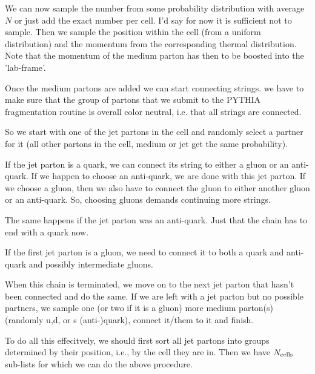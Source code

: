 We can now sample the number from some probability distribution with average $N$
or just add the exact number per cell. I'd say for now it is sufficient not to sample.
Then we sample the position within the cell (from a uniform distribution) and the momentum from the corresponding thermal 
distribution. Note that the momentum of the medium parton has then to be boosted into the 'lab-frame'.

Once the medium partons are added we can start connecting strings. we have to make sure that the group of partons that we
submit to the PYTHIA fragmentation routine is overall color neutral, i.e. that all strings are connected.

So we start with one of the jet partons in the cell and randomly select a partner for it (all other partons in the cell, 
medium or jet get the same probability).
 
If the jet parton is a quark, we can connect its string to either a gluon or an anti-quark. If we happen to choose an anti-quark,
we are done with this jet parton. If we choose a gluon, then we also have to connect the gluon to either another gluon or an anti-quark.
So, choosing gluons demands continuing more strings.

The same happens if the jet parton was an anti-quark. Just that the chain has to end with a quark now.

If the first jet parton is a gluon, we need to connect it to both a quark and anti-quark and possibly intermediate gluons.

When this chain is terminated, we move on to the next jet parton
that hasn't been connected and do the same. If we are left with a jet parton but no possible partners, 
we sample one (or two if it is a gluon) more medium parton(s) (randomly u,d, or s (anti-)quark), connect it/them to it and finish.   

To do all this effecitvely, we should first sort all jet partons into groups determined by their position, i.e., by the cell they are in.
Then we have $N_{\rm cells}$ sub-lists for which we can do the above procedure.



